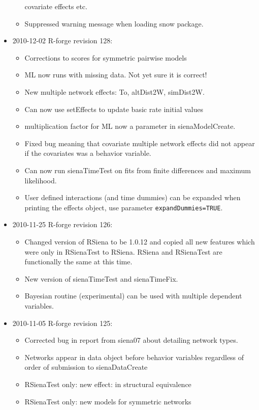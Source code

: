\documentclass[a4paper,fleqn,11pt]{article}
\newcommand{\+}{\, + \,}
\begin{document}
\begin{small}
\begin{itemize}
\begin{itemize}
  covariate effects etc.
\item Suppressed warning message when loading snow package.
\end{itemize}
\item 2010-12-02 R-forge revision 128:
\begin{itemize}
\item Corrections to scores for symmetric pairwise models
\item ML now runs with missing data. Not yet sure it is correct!
\item New multiple network effects: To, altDist2W, simDist2W.
\item Can now use setEffects to update basic rate initial values
\item multiplication factor for ML now a parameter in sienaModelCreate.
\item Fixed bug meaning that covariate multiple network effects did not appear
  if the covariates was a behavior variable.
\item Can now run sienaTimeTest on fits from finite differences and maximum
  likelihood.
\item User defined interactions (and time dummies) can be expanded
  when printing
  the effects object, use parameter \texttt{expandDummies=TRUE}.
\end{itemize}
\item 2010-11-25 R-forge revision 126:
\begin{itemize}
\item Changed version of RSiena to be 1.0.12 and copied all new features which
  were only in RSienaTest to RSiena. RSiena and RSienaTest are
  functionally the same at this time.
\item New version of sienaTimeTest and sienaTimeFix.
\item Bayesian routine (experimental) can be used with multiple dependent
  variables.
\end{itemize}
\item 2010-11-05 R-forge revision 125:
\begin{itemize}
\item Corrected bug in report from siena07 about detailing network types.
\item Networks appear in data object before behavior variables regardless of
order of submission to sienaDataCreate
\item RSienaTest only: new effect: in structural equivalence
\item RSienaTest only: new models for symmetric networks

\end{itemize}
\end{itemize}
\end{small}
\end{document}
